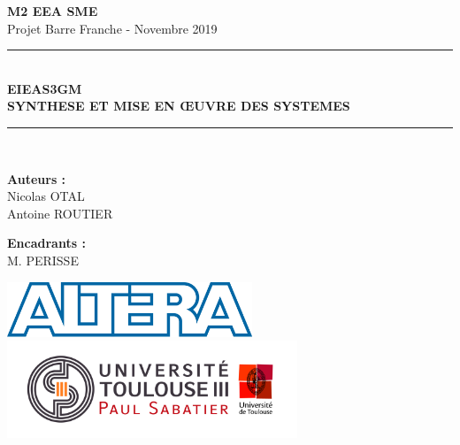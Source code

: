 \begin{titlepage}
    \begin{center}
    \huge{\textbf{M2 EEA SME}}\\[0.5 cm]
    {\large Projet Barre Franche - Novembre 2019}\\[0.5cm]
    
    \rule{\linewidth}{0.5mm} \\[0.4cm]
    {\huge \bfseries EIEAS3GM \\ SYNTHESE ET MISE EN ŒUVRE DES SYSTEMES\\[0.4cm]}
    \rule{\linewidth}{0.5mm} \\[1.5cm]
    
    
    
    \begin{center}
    \begin{minipage}[t]{0.46\textwidth}
      \begin{flushleft} \large
        \textbf{Auteurs :}\\
        Nicolas OTAL\\
        Antoine ROUTIER\\
      \end{flushleft}
    \end{minipage}
    \begin{minipage}[t]{0.46\textwidth}
      \begin{flushright} \large
        \textbf{Encadrants :}\\
        M. PERISSE\\
      \end{flushright}
    \end{minipage}
    \end{center}
    
    \vfill
    
    
    \begin{center}
      \includegraphics[width=0.55\textwidth]{Images/altera.png}
      \vfill
      \includegraphics[width=0.65\textwidth]{Images/Upstls.jpg}
      \end{center}
      
      \end{center}
    \end{titlepage}